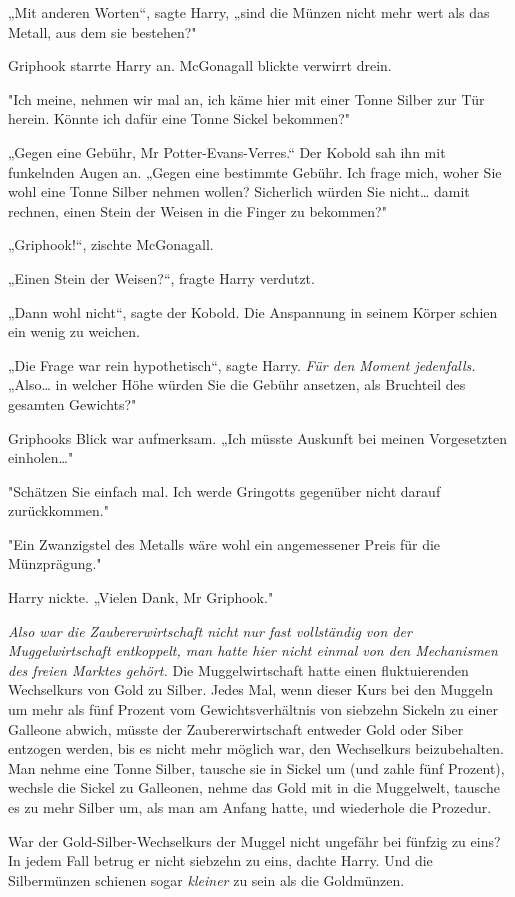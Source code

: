 {„Mit anderen Worten“, sagte Harry, „sind die Münzen nicht mehr wert als das Metall, aus dem sie bestehen?"

Griphook starrte Harry an. McGonagall blickte verwirrt drein.

"Ich meine, nehmen wir mal an, ich käme hier mit einer Tonne Silber zur Tür herein. Könnte ich dafür eine Tonne Sickel bekommen?"

„Gegen eine Gebühr, Mr Potter-Evans-Verres.“ Der Kobold sah ihn mit funkelnden Augen an. „Gegen eine bestimmte Gebühr. Ich frage mich, woher Sie wohl eine Tonne Silber nehmen wollen? Sicherlich würden Sie nicht… damit rechnen, einen Stein der Weisen in die Finger zu bekommen?"

„Griphook!“, zischte McGonagall.

„Einen Stein der Weisen?“, fragte Harry verdutzt.

„Dann wohl nicht“, sagte der Kobold. Die Anspannung in seinem Körper schien ein wenig zu weichen.

„Die Frage war rein hypothetisch“, sagte Harry. \emph{Für den Moment jedenfalls.} „Also… in welcher Höhe würden Sie die Gebühr ansetzen, als Bruchteil des gesamten Gewichts?"

Griphooks Blick war aufmerksam. „Ich müsste Auskunft bei meinen Vorgesetzten einholen…"

"Schätzen Sie einfach mal. Ich werde Gringotts gegenüber nicht darauf zurückkommen."

"Ein Zwanzigstel des Metalls wäre wohl ein angemessener Preis für die Münzprägung."

Harry nickte. „Vielen Dank, Mr Griphook."

\emph{Also war die Zaubererwirtschaft nicht nur fast vollständig von der Muggelwirtschaft entkoppelt, man hatte hier nicht einmal von den Mechanismen des freien Marktes gehört.} Die Muggelwirtschaft hatte einen fluktuierenden Wechselkurs von Gold zu Silber. Jedes Mal, wenn dieser Kurs bei den Muggeln um mehr als fünf Prozent vom Gewichtsverhältnis von siebzehn Sickeln zu einer Galleone abwich, müsste der Zaubererwirtschaft entweder Gold oder Siber entzogen werden, bis es nicht mehr möglich war, den Wechselkurs beizubehalten. Man nehme eine Tonne Silber, tausche sie in Sickel um (und zahle fünf Prozent), wechsle die Sickel zu Galleonen, nehme das Gold mit in die Muggelwelt, tausche es zu mehr Silber um, als man am Anfang hatte, und wiederhole die Prozedur.

War der Gold-Silber-Wechselkurs der Muggel nicht ungefähr bei fünfzig zu eins? In jedem Fall betrug er nicht siebzehn zu eins, dachte Harry. Und die Silbermünzen schienen sogar \emph{kleiner} zu sein als die Goldmünzen.

}
